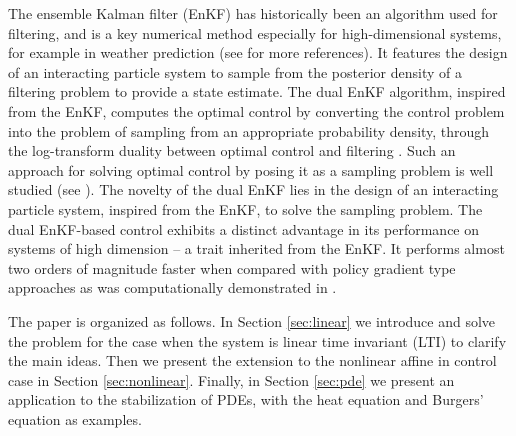 \documentclass[10pt,a4paper]{amsart}
\begin{document}
The ensemble Kalman filter (EnKF) \cite{yang-2016,amir-2019} has historically been an algorithm used for filtering, and is a key numerical method especially for high-dimensional systems, for example in weather prediction \cite{evensen2006} (see \cite{bishop-2023} for more references). It features the design of an interacting particle system to sample from the posterior density of a filtering problem to provide a state estimate. 
The dual EnKF algorithm, inspired from the EnKF, computes the optimal control by converting the control problem into the problem of sampling from an appropriate probability density, through the log-transform duality between optimal control and filtering \cite{fleming-1982}. Such an approach for solving optimal control by posing it as a sampling problem is well studied
(see \cite{todorov-2007,kappen-2005,rawlik2013stochastic,hoffman-2017,levine-2018}). 
The novelty of the dual EnKF lies in the design of an interacting particle system, inspired from the EnKF, to solve the sampling problem. 
The dual EnKF-based control exhibits a distinct advantage in its performance on systems of high dimension -- a trait inherited from the EnKF. It performs almost two orders of magnitude faster when compared with policy gradient type approaches \cite{mihailo-2021-tac,fazel-2018-mlr} as was computationally demonstrated in \cite{joshi-2022}. 


The paper is organized as follows. In Section \ref{sec:linear} we introduce and solve the problem for the case when the system is linear time invariant (LTI) to clarify the main ideas. Then we present the extension to the nonlinear affine in control case in Section \ref{sec:nonlinear}. 
Finally, in Section \ref{sec:pde} we present an application to the stabilization of PDEs, with the heat equation and Burgers' equation as examples. 

\end{document}
